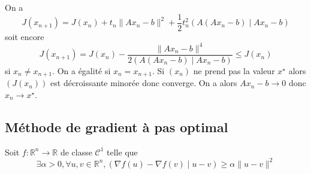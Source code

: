 On a \[
    J(x_{n+1})=J(x_n) + t_n\|Ax_n-b\|^2 +\frac12t_n^2(A(Ax_n-b)\;|\;Ax_n-b)
\]
soit encore \[
    J(x_{n+1})=J(x_n) -\frac{\|Ax_n-b\|^4}{2(A(Ax_n-b)\;|\;Ax_n-b)} \leq J(x_n)
\]
si $x_n\neq x_{n+1}$. On a égalité si $x_n=x_{n+1}$.  
Si $(x_n)$ ne prend pas la valeur $x^\star$ alors $(J(x_n))$ est décroissante minorée donc converge. On a alors $Ax_n-b\longrightarrow 0$ donc $x_n\longrightarrow x^\star$.

\subsection{Méthode de gradient à pas optimal}

Soit $f:\mathbb R^n\to \mathbb R$ de classe $\mathcal C^1$ telle que \[
    \exists \alpha > 0, \forall u, v\in\mathbb R^n, (\nabla f(u)-\nabla f(v)\;|\; u-v)\geq \alpha\|u-v\|^2
\]

